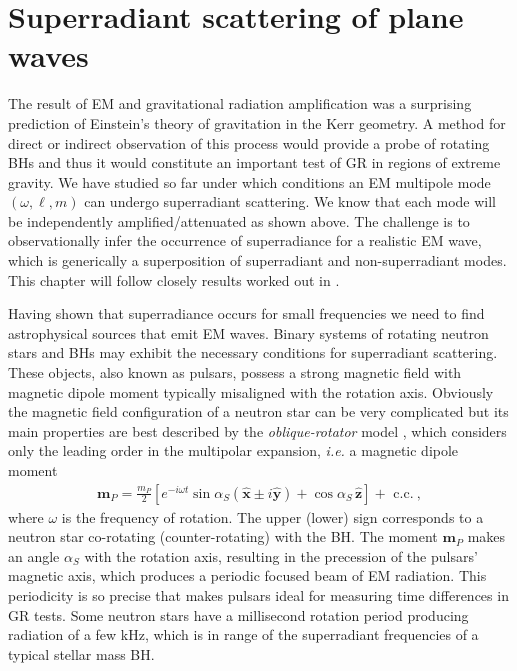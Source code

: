 
\chapter{Superradiant scattering of plane waves} %
\label{Chapter5}

The result of EM and gravitational radiation amplification was a surprising prediction of Einstein's theory of gravitation in the Kerr geometry.
A method for direct or indirect observation of this process would provide a probe of rotating BHs and thus it would constitute an important test of GR in regions of extreme gravity.
We have studied so far under which conditions an EM multipole mode $(\omega,\ell, m)$ can undergo superradiant scattering.
We know that each mode will be independently amplified/attenuated as shown above.
The challenge is to observationally infer the occurrence of superradiance for a realistic EM wave, which is generically a superposition of superradiant and non-superradiant modes. This chapter will follow closely results worked out in \cite{Rosa2017}.

Having shown that superradiance occurs for small frequencies we need to find astrophysical sources that emit EM waves.
Binary systems of rotating neutron stars and BHs may exhibit the necessary conditions for superradiant scattering.
These objects, also known as pulsars, possess a strong magnetic field with magnetic dipole moment typically misaligned with the rotation axis.
Obviously the magnetic field configuration of a neutron star can be very complicated but its main properties are best described by the \emph{oblique-rotator} model \cite{Pacini1968}, which considers only the leading order in the multipolar expansion, \emph{i.e.} a magnetic dipole moment
\begin{align}
    \mathbf{m}_P = \frac{m_P}{2} \left[ e^{-i \omega t} \sin\alpha_S ( \mathbf{\hat{x}} \pm i \mathbf{\hat{y}}) + \cos\alpha_S \,\mathbf{\hat{z}} \right] + \text{ c.c.} ~,
\end{align}
where $\omega$ is the frequency of rotation.
The upper (lower) sign corresponds to a neutron star co-rotating (counter-rotating) with the BH.
The moment $\mathbf{m}_P$ makes an angle $\alpha_S$ with the rotation axis, resulting in the precession of the pulsars' magnetic axis, which produces a periodic focused beam of EM radiation.
This periodicity is so precise that makes pulsars ideal for measuring time differences in GR tests.
Some neutron stars have a millisecond rotation period producing radiation of a few kHz, which is in range of the superradiant frequencies of a typical stellar mass BH.  


